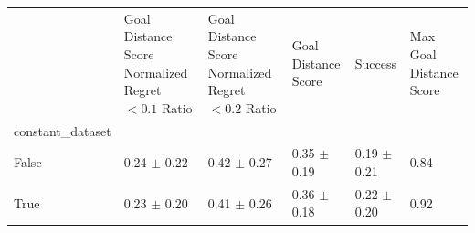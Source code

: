 \begin{tabular}{llllll}
\toprule
 & Goal Distance Score Normalized Regret $< 0.1$ Ratio & Goal Distance Score Normalized Regret $< 0.2$ Ratio & Goal Distance Score & Success & Max Goal Distance Score \\
constant_dataset &  &  &  &  &  \\
\midrule
False & 0.24 $\pm$ 0.22 & 0.42 $\pm$ 0.27 & 0.35 $\pm$ 0.19 & 0.19 $\pm$ 0.21 & 0.84 \\
True & 0.23 $\pm$ 0.20 & 0.41 $\pm$ 0.26 & 0.36 $\pm$ 0.18 & 0.22 $\pm$ 0.20 & 0.92 \\
\bottomrule
\end{tabular}
